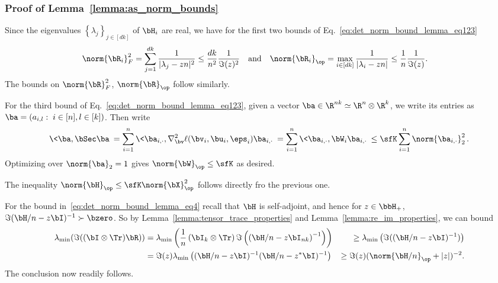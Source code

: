 \subsubsection{Proof of Lemma~\ref{lemma:as_norm_bounds}}
\label{sec:proof_lemma_as_norm_bounds}
Since the eigenvalues $\left\{\lambda_j\right\}_{j\in[dk]}$ of $\bH_i$ are  real, we have
for the first two bounds of Eq.~\eqref{eq:det_norm_bound_lemma_eq123}
\begin{align}
\nonumber
   \norm{\bR_i}_{F}^2 
   &= \sum_{j=1}^{dk} \frac{1}{|\lambda_j - z n|^2 }
\le \frac{dk}{n^2} \frac1{\Im(z)^2}\quad\textrm{and}\quad
   \norm{\bR_i}_{\op}
   = \max_{i \in [dk]} \frac{1}{|\lambda_i - z n| }
\le \frac{1}{n} \frac1{\Im(z)}.
\end{align}
The bounds on $\norm{\bR}_{F}^2$, $\norm{\bR}_{\op}$
follow similarly.

For the third bound of Eq.~\eqref{eq:det_norm_bound_lemma_eq123}, given a vector $\ba\in\R^{nk}\simeq \R^{n}\otimes \R^k$, 
we write its entries as $\ba = (a_{i,l}: \; i\in[n],
l\in [k])$.
Then write
\begin{align}
\nonumber
    \<\ba,\bSec\ba\> 
= \sum_{i=1}^n \< \ba_{i,\cdot}, \nabla^2_{\bv}\ell(\bv_i,\bu_i,\eps_i) \ba_{i,\cdot}\> 
    =  \sum_{i=1}^n \< \ba_{i,\cdot}, \bW_i \ba_{i,\cdot}\>  
    \le\sfK  \sum_{i=1}^n \norm{\ba_{i,\cdot}}_2^2\, .
\end{align}
%
Optimizing over $\norm{\ba}_2 = 1$ gives $\norm{\bW}_\op \le \sfK$ as desired.

The inequality $\norm{\bH}_\op \le\sfK \norm{\bX}_\op^2$ follows directly fro the previous one.

For the bound in~\eqref{eq:det_norm_bound_lemma_eq4}
recall that $\bH$ is self-adjoint, and hence for $z\in\bbH_+$, 
$\Im(\bH/n - z\bI)^{-1} \succ \bzero$. So by Lemma~\ref{lemma:tensor_trace_properties} and Lemma~\ref{lemma:re_im_properties}, we can bound
\begin{align*}
   \lambda_{\min}(\Im((\bI\otimes\Tr)\bR)) &= \lambda_{\min}\left( 
    \frac1n \left( \bI_k \otimes \Tr\right) \Im\left(\left(\bH/n - z \bI_{nk}\right)^{-1}\right)\right)
    &\ge  \lambda_{\min}\left(\Im((\bH/n - z\bI)^{-1})\right)\\
&=  \Im(z)\lambda_{\min}\left(
(\bH/n -z\bI)^{-1}(\bH/n -z^*\bI)^{-1}
\right)
&\ge  \Im(z)(\norm{\bH/n}_\op  + |z|)^{-2}.
\end{align*}
The conclusion now readily follows.

